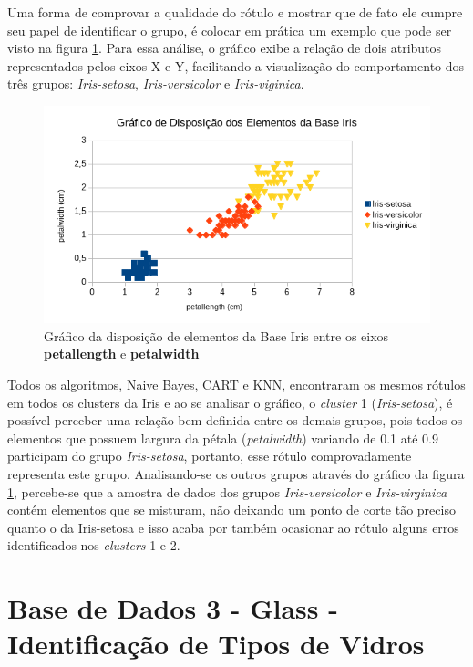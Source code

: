 Uma forma de comprovar a qualidade do rótulo e mostrar que de fato ele cumpre seu papel de identificar o grupo, é colocar em prática um exemplo que pode ser visto na figura \ref{fig:grafico_iris_petalwidth_petallength_BrOf}. Para essa análise, o gráfico exibe a relação de dois atributos representados pelos eixos X e Y, facilitando a visualização do comportamento dos três grupos: \textit{Iris-setosa}, \textit{Iris-versicolor} e \textit{Iris-viginica}.

\begin{figure}[h!]
        \centering
        \includegraphics[scale=0.9]{figs/grafico_iris_petalwidth_petallength_BrOf.png}
        \caption{Gráfico da disposição de elementos da Base Iris entre os eixos \textbf{petallength} e \textbf{petalwidth}} \label{fig:grafico_iris_petalwidth_petallength_BrOf}
\end{figure}


Todos os algoritmos, Naive Bayes, CART e KNN, encontraram os mesmos rótulos em todos os clusters da Iris e ao se analisar o gráfico, o \textit{cluster} 1 (\textit{Iris-setosa}), é possível perceber uma relação bem definida entre os demais grupos, pois todos os elementos que possuem largura da pétala (\textit{petalwidth}) variando de 0.1 até 0.9 participam do grupo \textit{Iris-setosa}, portanto, esse rótulo comprovadamente representa este grupo. Analisando-se os outros grupos através do gráfico da figura \ref{fig:grafico_iris_petalwidth_petallength_BrOf}, percebe-se que a amostra de dados dos grupos \textit{Iris-versicolor} e \textit{Iris-virginica} contém elementos que se misturam, não deixando um ponto de corte tão preciso quanto o da Iris-setosa e isso acaba por também ocasionar ao rótulo alguns erros identificados nos \textit{clusters} 1 e 2. 

\section{Base de Dados 3 - Glass - Identificação de Tipos de Vidros}\label{cap:resultados:ssec:iris}


